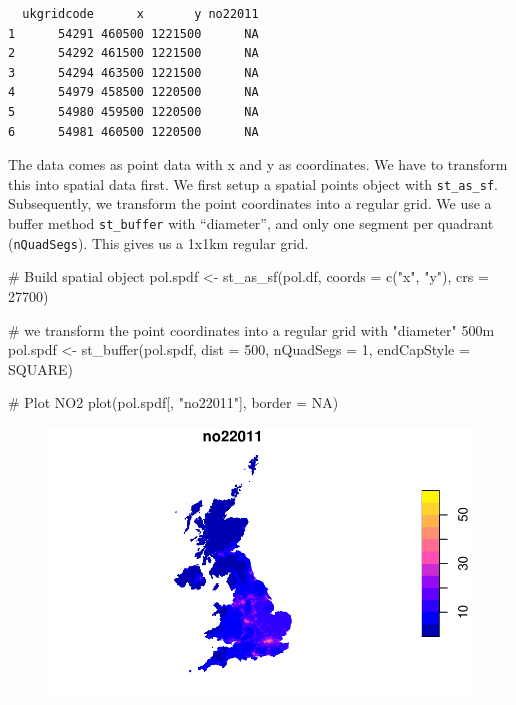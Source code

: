 \documentclass[
  letterpaper,
  DIV=11,
  numbers=noendperiod]{scrreprt}
\newenvironment{Shaded}{\begin{snugshade}}{\end{snugshade}}
\newcommand{\AttributeTok}[1]{\textcolor[rgb]{0.40,0.45,0.13}{#1}}
\newcommand{\CommentTok}[1]{\textcolor[rgb]{0.37,0.37,0.37}{#1}}
\newcommand{\ConstantTok}[1]{\textcolor[rgb]{0.56,0.35,0.01}{#1}}
\newcommand{\DecValTok}[1]{\textcolor[rgb]{0.68,0.00,0.00}{#1}}
\newcommand{\FunctionTok}[1]{\textcolor[rgb]{0.28,0.35,0.67}{#1}}
\newcommand{\NormalTok}[1]{\textcolor[rgb]{0.00,0.23,0.31}{#1}}
\newcommand{\OtherTok}[1]{\textcolor[rgb]{0.00,0.23,0.31}{#1}}
\newcommand{\StringTok}[1]{\textcolor[rgb]{0.13,0.47,0.30}{#1}}
\begin{document}
\begin{verbatim}
  ukgridcode      x       y no22011
1      54291 460500 1221500      NA
2      54292 461500 1221500      NA
3      54294 463500 1221500      NA
4      54979 458500 1220500      NA
5      54980 459500 1220500      NA
6      54981 460500 1220500      NA
\end{verbatim}

The data comes as point data with x and y as coordinates. We have to
transform this into spatial data first. We first setup a spatial points
object with \texttt{st\_as\_sf}. Subsequently, we transform the point
coordinates into a regular grid. We use a buffer method
\texttt{st\_buffer} with ``diameter'', and only one segment per quadrant
(\texttt{nQuadSegs}). This gives us a 1x1km regular grid.

\begin{Shaded}
\begin{Highlighting}[]
\CommentTok{\# Build spatial object}
\NormalTok{pol.spdf }\OtherTok{\textless{}{-}} \FunctionTok{st\_as\_sf}\NormalTok{(pol.df, }\AttributeTok{coords =} \FunctionTok{c}\NormalTok{(}\StringTok{"x"}\NormalTok{, }\StringTok{"y"}\NormalTok{),}
                    \AttributeTok{crs =} \DecValTok{27700}\NormalTok{)}

\CommentTok{\# we transform the point coordinates into a regular grid with "diameter" 500m}
\NormalTok{pol.spdf }\OtherTok{\textless{}{-}} \FunctionTok{st\_buffer}\NormalTok{(pol.spdf, }\AttributeTok{dist =} \DecValTok{500}\NormalTok{, }\AttributeTok{nQuadSegs  =} \DecValTok{1}\NormalTok{,}
                      \AttributeTok{endCapStyle =} \StringTok{\textquotesingle{}SQUARE\textquotesingle{}}\NormalTok{)}

\CommentTok{\# Plot NO2}
\FunctionTok{plot}\NormalTok{(pol.spdf[, }\StringTok{"no22011"}\NormalTok{], }\AttributeTok{border =} \ConstantTok{NA}\NormalTok{)}
\end{Highlighting}
\end{Shaded}

\begin{figure}[H]

{\centering \includegraphics{01_refresher_short_files/figure-pdf/unnamed-chunk-14-1.pdf}

}

\end{figure}
\end{document}
